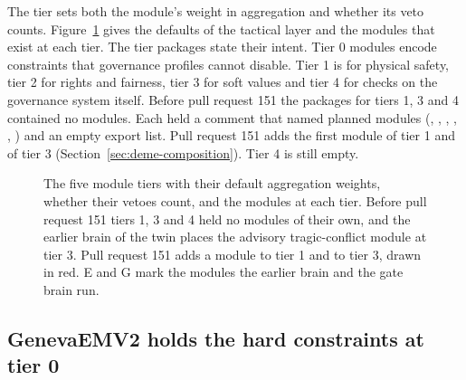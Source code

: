 The tier sets both the module's weight in aggregation and whether its veto counts.
Figure~\ref{fig:deme-tiers} gives the defaults of the tactical layer and the modules that exist
at each tier. The tier packages state their intent. Tier 0 modules encode constraints that
governance profiles cannot disable. Tier 1 is for physical safety, tier 2 for rights and
fairness, tier 3 for soft values and tier 4 for checks on the governance system itself. Before
pull request 151 the packages for tiers 1, 3 and 4 contained no modules. Each held a comment that
named planned modules (, , ,
, , ) and an empty
export list. Pull request 151 adds the first module of tier 1 and of tier 3
(Section~\ref{sec:deme-composition}). Tier 4 is still empty.

\begin{figure}[t]
\centering

\caption{The five module tiers with their default aggregation weights, whether their vetoes
count, and the modules at each tier. Before pull request 151 tiers 1, 3 and 4 held no modules of
their own, and the earlier brain of the twin places the advisory tragic-conflict module at tier 3. Pull
request 151 adds a module to tier 1 and to tier 3, drawn in red. E and G mark the modules the
earlier brain and the gate brain run.}
\label{fig:deme-tiers}
\end{figure}

\subsection{GenevaEMV2 holds the hard constraints at tier 0}

